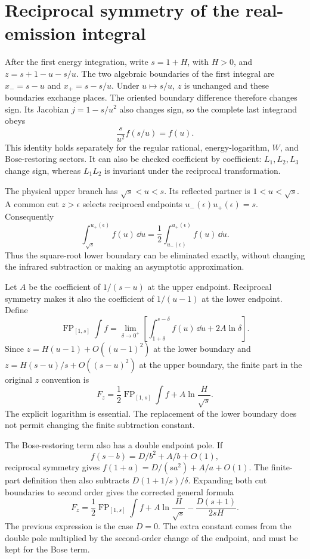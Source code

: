 \section{Reciprocal symmetry of the real-emission integral}
After the first energy integration, write $s=1+H$, with $H>0$,
and $z=s+1-u-s/u$. The two algebraic boundaries of the first
integral are $x_-=s-u$ and $x_+=s-s/u$. Under $u\mapsto s/u$,
$z$ is unchanged and these boundaries exchange places. The
oriented boundary difference therefore changes sign. Its
Jacobian $j=1-s/u^2$ also changes sign, so the complete last
integrand obeys
\begin{equation}
 \frac{s}{u^2}f(s/u)=f(u).
\end{equation}
This identity holds separately for the regular rational,
energy-logarithm, $W$, and Bose-restoring sectors. It can also be
checked coefficient by coefficient: $L_1,L_2,L_3$ change sign,
whereas $L_1L_2$ is invariant under the reciprocal transformation.

The physical upper branch has $\sqrt{s}<u<s$. Its reflected
partner is $1<u<\sqrt{s}$. A common cut $z>\epsilon$ selects
reciprocal endpoints $u_-(\epsilon)u_+(\epsilon)=s$. Consequently
\begin{equation}
 \int_{\sqrt{s}}^{u_+(\epsilon)}f(u)\,\dd u
 =\frac12\int_{u_-(\epsilon)}^{u_+(\epsilon)}f(u)\,\dd u.
\end{equation}
Thus the square-root lower boundary can be eliminated exactly,
without changing the infrared subtraction or making an asymptotic
approximation.

Let $A$ be the coefficient of $1/(s-u)$ at the upper endpoint.
Reciprocal symmetry makes it also the coefficient of $1/(u-1)$
at the lower endpoint. Define
\begin{equation}
 \operatorname{FP}_{[1,s]}\int f
 =\lim_{\delta\to0^+}
 \left[\int_{1+\delta}^{s-\delta}f(u)\,\dd u+2A\ln\delta\right].
\end{equation}
Since $z=H(u-1)+O((u-1)^2)$ at the lower boundary and
$z=H(s-u)/s+O((s-u)^2)$ at the upper boundary, the finite part
in the original $z$ convention is
\begin{equation}
 F_z=\frac12\operatorname{FP}_{[1,s]}\int f
                  +A\ln\frac{H}{\sqrt{s}}.
\end{equation}
The explicit logarithm is essential. The replacement of the lower
boundary does not permit changing the finite subtraction constant.

The Bose-restoring term also has a double endpoint pole. If
\begin{equation}
 f(s-b)=D/b^2+A/b+O(1),
\end{equation}
reciprocal symmetry gives $f(1+a)=D/(sa^2)+A/a+O(1)$.
The finite-part definition then also subtracts
$D(1+1/s)/\delta$. Expanding both cut boundaries to second order
gives the corrected general formula
\begin{equation}
 F_z=\frac12\operatorname{FP}_{[1,s]}\int f
       +A\ln\frac{H}{\sqrt{s}}-\frac{D(s+1)}{2sH}.
\end{equation}
The previous expression is the case $D=0$. The extra constant
comes from the double pole multiplied by the second-order change
of the endpoint, and must be kept for the Bose term.

